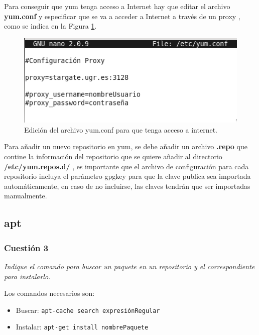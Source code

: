 Para conseguir que yum tenga acceso a Internet hay que editar el archivo \textbf{yum.conf} y especificar que se va a acceder a Internet a través de un proxy , como se indica en la Figura \ref{fig41}. \cite{centosproxy}

\begin{figure}[H]
    \begin{center}
        \includegraphics[scale=0.8]{imagenes/img44}
        \caption{Edición del archivo yum.conf para que tenga acceso a internet.}
        \label{fig41}
    \end{center}
\end{figure}


Para añadir un nuevo repositorio en yum, se debe añadir un archivo \textbf{.repo} que contine la información del repositorio que se quiere añadir al directorio \textbf{/etc/yum.repos.d/} , es importante que el archivo de configuración para cada repositorio incluya el parámetro gpgkey para que la clave publica sea importada automáticamente, en caso de no incluirse, las claves tendrán que ser importadas manualmente. \cite{centosadd}
\subsection{apt}

\subsubsection{Cuestión 3}
\textit{Indique el comando para buscar un paquete en un repositorio y el correspondiente para instalarlo.}
\newline

Los comandos necesarios son: \cite{manapt1} \cite{manapt2}
\begin{itemize}
  \item Buscar: \texttt{apt-cache search expresiónRegular }
  \item Instalar: \texttt{apt-get install nombrePaquete}
\end{itemize}




